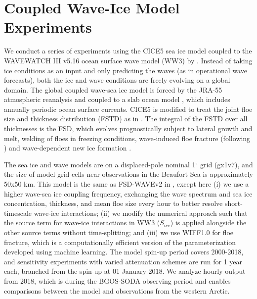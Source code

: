 \documentclass [11pt, proquest] {uwthesis}[2020/02/24]
\begin{document}
\section{Coupled Wave-Ice Model Experiments} \label{model}

We conduct a series of experiments using the CICE5 sea ice model \cite{Hunke2015CICE:LA-CC-06-012} coupled to the WAVEWATCH III v5.16 ocean surface wave model (WW3) \cite{TheWAVEWATCHIIIRDevelopmentGroupWW3DG2016User5.16} by \cite{Roach2019}. Instead of taking ice conditions as an input and only predicting the waves (as in operational wave forecasts), both the ice and wave conditions are freely evolving on a global domain. The global coupled wave-sea ice model is forced by the JRA-55 atmospheric reanalysis \cite{KOBAYASHI2015TheCharacteristics, cisl_rda_ds628.0} and coupled to a slab ocean model \cite{Bitz2012Climate4}, which includes annually periodic ocean surface currents. CICE5 is modified to treat the joint floe size and thickness distribution (FSTD) as in \cite{Roach2018AnModel, Roach2019}. The integral of the FSTD over all thicknesses is the FSD, which evolves prognostically subject to lateral growth and melt, welding of floes in freezing conditions, wave-induced floe fracture (following \cite{Horvat2015}) and wave-dependent new ice formation \cite{Roach2018AnModel,Roach2019}.  

The sea ice and wave models are on a displaced-pole nominal 1$^\circ$ grid (gx1v7), and the size of model grid cells near observations in the Beaufort Sea is approximately 50x50 km. This model is the same as FSD-WAVEv2 in \cite{Roach2019}, except here (i) we use a higher wave-sea ice coupling frequency, exchanging the wave spectrum and sea ice concentration, thickness, and mean floe size every hour to better resolve short-timescale wave-ice interactions; (ii) we modify the numerical approach such that the source term for wave-ice interactions in WW3 ($S_{ice}$) is applied alongside the other source terms without time-splitting; and (iii) we use WIFF1.0 \cite{Horvat2022WIFF1.0:Fracture} for floe fracture, which is a computationally efficient version of the \cite{Horvat2015} parameterization developed using machine learning. The model spin-up period covers 2000-2018, and sensitivity experiments with varied attenuation schemes are run for 1 year each, branched from the spin-up at 01 January 2018. We analyze hourly output from 2018, which is during the BGOS-SODA observing period and enables comparisons between the model and observations from the western Arctic.  
\end{document}
